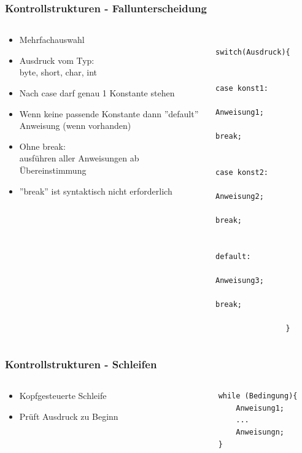 \begin{frame}[fragile]
	\frametitle{Kontrollstrukturen - Fallunterscheidung}
	\begin{columns}
		\begin{column}{0.5\textwidth}
			\small
			\begin{itemize}
			  \item Mehrfachauswahl
			  \item Ausdruck vom Typ:\\
			  byte, short, char, int
			  \item Nach case darf genau 1 Konstante stehen
			  \item Wenn keine passende Konstante 
			  dann ''default'' Anweisung (wenn vorhanden)
			  \item Ohne break: \\
			  ausf\"uhren aller Anweisungen ab \"Ubereinstimmung
			  \item ''break'' ist syntaktisch nicht erforderlich
			\end{itemize}
		\end{column}
		\begin{column}{0.5\textwidth}
			\begin{lstlisting}
				switch(Ausdruck){
					
					case konst1:
						Anweisung1;
						break;
						
					case konst2:
						Anweisung2;
						break;
						
					default:
						Anweisung3;
						break;
						
				}
			\end{lstlisting}
		\end{column}
	\end{columns}
\end{frame}

\begin{frame}[fragile]
	\frametitle{Kontrollstrukturen - Schleifen}
	\begin{columns}
		\begin{column}{0.5\textwidth}
		\small
			\begin{itemize}
			  \item Kopfgesteuerte Schleife
			  \item Pr\"uft Ausdruck zu Beginn 
			\end{itemize}
		\end{column}
		\begin{column}{0.5\textwidth}
			\begin{lstlisting}
				while (Bedingung){
					Anweisung1;
					...
					Anweisungn;
				}
			\end{lstlisting}
		\end{column}
	\end{columns}
\end{frame}


